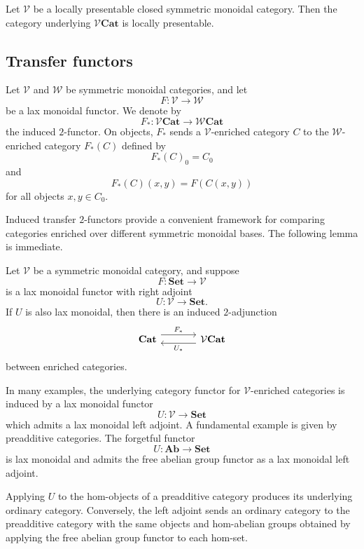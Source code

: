 \documentclass{tac}
\begin{document}
\begin{lemma}
Let $\mathcal{V}$ be a locally presentable closed symmetric monoidal category.
Then the category underlying $\mathcal{V}\mathbf{Cat}$ is locally presentable.
\end{lemma}

\subsection*{Transfer functors}

\begin{notation}
Let $\mathcal{V}$ and $\mathcal{W}$ be symmetric monoidal categories, and let
\[
F:\mathcal{V}\longrightarrow\mathcal{W}
\]
be a lax monoidal functor. We denote by
\[
F_*:\mathcal{V}\mathbf{Cat}\longrightarrow\mathcal{W}\mathbf{Cat}
\]
the induced $2$-functor. On objects, $F_*$ sends a
$\mathcal{V}$-enriched category $C$ to the $\mathcal{W}$-enriched category
$F_*(C)$ defined by
\[
F_*(C)_0=C_0
\]
and
\[
F_*(C)(x,y)=F(C(x,y))
\]
for all objects $x,y\in C_0$.
\end{notation}

Induced transfer $2$-functors provide a convenient framework for comparing
categories enriched over different symmetric monoidal bases. The following
lemma is immediate.

\begin{lemma}\label{ind_adjunct_enriched}
Let $\mathcal{V}$ be a symmetric monoidal category, and suppose
\[
F:\mathbf{Set}\longrightarrow\mathcal{V}
\]
is a lax monoidal functor with right adjoint
\[
U:\mathcal{V}\longrightarrow\mathbf{Set}.
\]
If $U$ is also lax monoidal, then there is an induced $2$-adjunction
\[
\begin{tikzcd}[column sep=large]
\mathbf{Cat}
\arrow[r, shift left=1.2ex, "F_*"]
&
\mathcal{V}\mathbf{Cat}
\arrow[l, shift left=0.8ex, "U_*"]
\end{tikzcd}
\]
between enriched categories.
\end{lemma}

In many examples, the underlying category functor for
$\mathcal{V}$-enriched categories is induced by a lax monoidal functor
\[
U:\mathcal{V}\longrightarrow\mathbf{Set}
\]
which admits a lax monoidal left adjoint. A fundamental example is given by
preadditive categories. The forgetful functor
\[
U:\mathbf{Ab}\longrightarrow\mathbf{Set}
\]
is lax monoidal and admits the free abelian group functor as a lax monoidal
left adjoint.

Applying $U$ to the hom-objects of a preadditive category produces its
underlying ordinary category. Conversely, the left adjoint sends an ordinary
category to the preadditive category with the same objects and hom-abelian
groups obtained by applying the free abelian group functor to each hom-set.
\end{document}
